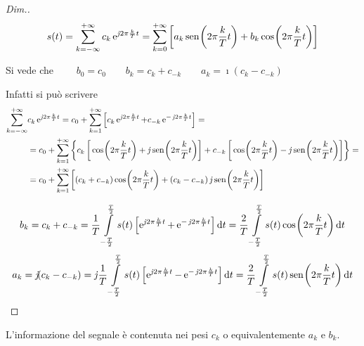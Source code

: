 \begin{proof}[Dim.]
\[
	s(t)=\sum_{k=-\infty}^{+\infty} c_k \operatorname{e}^{\operatorname{\mathit{j}\!} 2\pi\frac{k}{T}t} = \sum_{k=0}^{+\infty}\left[ a_k \,{\operatorname{sen}}^{}\!\left({2\pi\frac{k}{T}t}\right) + b_k \,{\operatorname{cos}}^{}\!\left({2\pi\frac{k}{T}t}\right)\right]
\]

Si vede che $\qquad b_0=c_0 \qquad b_k=c_k+c_{-k} \qquad a_k=\imath (c_k-c_{-k})$

Infatti si può scrivere
\begin{align*}
	\sum_{k=-\infty}^{+\infty}&c_k\e{\imath 2\pi\frac{k}{T}t}=c_0+ \sum_{k=1}^{+\infty}\left[c_k\e{\imath 2\pi\frac{k}{T}t}+c_{-k}\e{-\imath 2\pi\frac{k}{T}t}\right]=\\
	&=c_0+\sum_{k=1}^{+\infty}{\left\lbrace c_k \left[\cos{2\pi\frac{k}{T}t}+\imath\sen{2\pi\frac{k}{T}t}\right]
	+c_{-k}\left[\cos{2\pi\frac{k}{T}t}-\imath\sen{2\pi\frac{k}{T}t}\right] \right\rbrace}=\\
	&=c_0+\sum_{k=1}^{+\infty}{\left[(c_k+c_{-k}) \cos{2\pi\frac{k}{T}t}+
	(c_k-c_{-k})\imath\sen{2\pi\frac{k}{T}t}\right]}
\end{align*}

\[
	b_k=c_k+c_{-k}=\frac{1}{T}\int\limits_{-\frac{T}{2}}^{\frac{T}{2}}{s(t)\left[\operatorname{e}^{\operatorname{\mathit{j}\!} 2\pi\frac{k}{T}t}+\operatorname{e}^{-\operatorname{\mathit{j}\!} 2\pi\frac{k}{T}t}\right]}{\,\mathop{}\!\mathrm{d}{t}}=\frac{2}{T}\int\limits_{-\frac{T}{2}}^{\frac{T}{2}}{s(t)\,{\operatorname{cos}}^{}\!\left({2\pi\frac{k}{T}t}\right)}{\,\mathop{}\!\mathrm{d}{t}}
\]
\[
	a_k=\operatorname{\mathit{j}\!}(c_k-c_{-k})=\operatorname{\mathit{j}\!}\frac{1}{T}\int\limits_{-\frac{T}{2}}^{\frac{T}{2}}{s(t)\left[\operatorname{e}^{\operatorname{\mathit{j}\!} 2\pi\frac{k}{T}t}-\operatorname{e}^{-\operatorname{\mathit{j}\!} 2\pi\frac{k}{T}t}\right]}{\,\mathop{}\!\mathrm{d}{t}}=\frac{2}{T}\int\limits_{-\frac{T}{2}}^{\frac{T}{2}}{s(t)\,{\operatorname{sen}}^{}\!\left({2\pi\frac{k}{T}t}\right)}{\,\mathop{}\!\mathrm{d}{t}}
\]
\end{proof}

\begin{nota}
	L'informazione del segnale è contenuta nei pesi $c_k$ o equivalentemente $a_k$ e $b_k$.
\end{nota}

